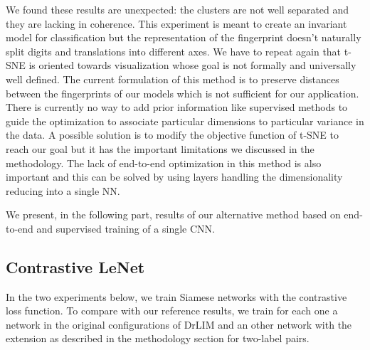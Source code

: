 \documentclass[a4paper,12pt]{report}
\begin{document}
We found these results are unexpected: the clusters are not well separated and they are lacking in coherence.
This experiment is meant to create an invariant model for classification but the representation of the fingerprint doesn't naturally split digits and translations into different axes.
We have to repeat again that t-SNE is oriented towards visualization whose goal is not formally and universally well defined.
The current formulation of this method is to preserve distances between the fingerprints of our models which is not sufficient for our application.
There is currently no way to add prior information like supervised methods to guide the optimization to associate particular dimensions to particular variance in the data.
A possible solution is to modify the objective function of t-SNE to reach our goal but it has the important limitations we discussed in the methodology.
The lack of end-to-end optimization in this method is also important and this can be solved by using layers handling the dimensionality reducing into a single NN.

We present, in the following part, results of our alternative method based on end-to-end and supervised training of a single CNN.

\subsection{Contrastive LeNet}

In the two experiments below, we train Siamese networks with the contrastive loss function.
To compare with our reference results, we train for each one a network in the original configurations of DrLIM and an other network with the extension as described in the methodology section for two-label pairs.
\end{document}
